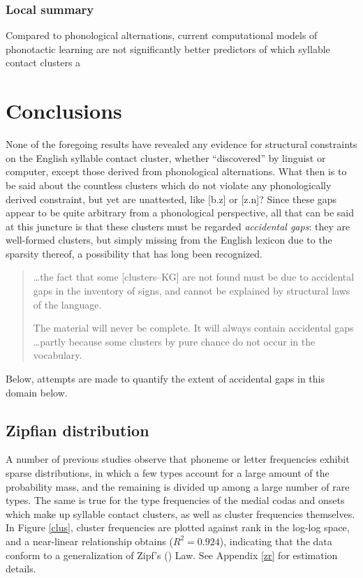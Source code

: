 \subsubsection{Local summary}

Compared to phonological alternations, current computational models of phonotactic learning are not significantly better predictors of which syllable contact clusters a

\section{Conclusions}

None of the foregoing results have revealed any evidence for structural constraints on the English syllable contact cluster, whether ``discovered'' by linguist or computer, except those derived from phonological alternations. What then is to be said about the countless clusters which do not violate any phonologically derived constraint, but yet are unattested, like [b.z] or [z.n]? Since these gaps appear to be quite arbitrary from a phonological perspective, all that can be said at this juncture is that these clusters must be regarded \emph{accidental gaps}: they are well-formed clusters, but simply missing from the English lexicon due to the sparsity thereof, a possibility that has long been recognized.

\begin{quote}
\ldots{}the fact that some [clusters--KG] are not found must be due to accidental gaps in the inventory of signs, and cannot be explained by structural laws of the language. \citep[][16]{Fischer-Jorgensen1952}

The material will never be complete. It will always contain accidental gaps \ldots partly because some clusters by pure chance do not occur in the vocabulary. \citep[][30]{Vogt1954}
\end{quote}

\noindent Below, attempts are made to quantify the extent of accidental gaps in this domain below.

\subsection{Zipfian distribution}

A number of previous studies \citep[e.g.,][]{Weiss1961,Sigurd1968,Good1969,Borodovsky1989,Witten1990,Martindale1996,Tambovtsev2007} observe that phoneme or letter frequencies exhibit sparse distributions, in which a few types account for a large amount of the probability mass, and the remaining is divided up among a large number of rare types. The same is true for the type frequencies of the medial codas and onsets which make up syllable contact clusters, as well as cluster frequencies themselves. In Figure \ref{clus}, cluster frequencies are plotted against rank in the log-log space, and a near-linear relationship obtains ($R^2 = 0.924$), indicating that the data conform to a generalization of Zipf's (\citeyear{Zipf1949}) Law. See Appendix \ref{zr} for estimation details.

